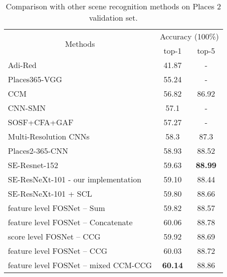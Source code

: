 \documentclass[journal,comsoc]{IEEEtran}
\begin{document}
\begin{table}[]
\centering
\caption{Comparison with other scene recognition methods on Places 2 \cite{b20} validation set.}
\begin{tabular}{lcc}
\toprule
\multicolumn{1}{c}{\multirow{2}{*}{Methods}}   & \multicolumn{2}{c}{Accuracy (100\%)} \\
\multicolumn{1}{c}{}                           & top-1             & top-5            \\ 
\midrule
Adi-Red \cite{b6}                              & 41.87             & -                \\
Places365-VGG \cite{b20}                       & 55.24             & -                \\
CCM \cite{b21}                                 & 56.82             & 86.92            \\
CNN-SMN \cite{b13}                             & 57.1              & -                \\
SOSF+CFA+GAF \cite{b4}                         & 57.27             & -                \\
Multi-Resolution CNNs \cite{b5}                & 58.3              & 87.3             \\
Places2-365-CNN \cite{b45}                     & 58.93             & 88.52            \\
SE-Resnet-152 \cite{b28}                       & 59.63             & \textbf{88.99}   \\
SE-ResNeXt-101 \cite{b28} - our implementation & 59.10             & 88.44            \\
SE-ResNeXt-101 + SCL                           & 59.80             & 88.66            \\
feature level FOSNet – Sum                     & 59.82             & 88.57            \\
feature level FOSNet – Concatenate             & 60.06             & 88.78            \\
score level FOSNet – CCG                      & 59.92             & 88.69            \\
feature level FOSNet – CCG                    & 60.03             & 88.72            \\
feature level FOSNet – mixed CCM-CCG          & \textbf{60.14}    & 88.86    \\       
\bottomrule
\end{tabular}
\label{tab1}
\end{table}
\end{document}
